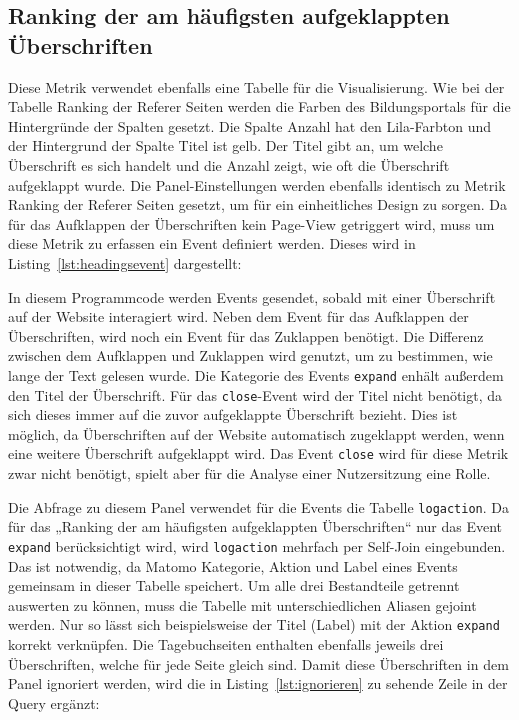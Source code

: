 \subsection{Ranking der am häufigsten aufgeklappten Überschriften}
Diese Metrik verwendet ebenfalls eine Tabelle für die Visualisierung. Wie bei der Tabelle \glqq Ranking der Referer Seiten\grqq{} werden die Farben des Bildungsportals für die Hintergründe der Spalten gesetzt. Die Spalte \glqq Anzahl\grqq{} hat den Lila-Farbton und der Hintergrund der Spalte \glqq Titel\grqq{} ist gelb. Der \glqq Titel\grqq{} gibt an, um welche Überschrift es sich handelt und die \glqq Anzahl\grqq{} zeigt, wie oft die Überschrift aufgeklappt wurde. Die Panel-Einstellungen werden ebenfalls identisch zu Metrik \glqq Ranking der Referer Seiten\grqq{} gesetzt, um für ein einheitliches Design zu sorgen. Da für das Aufklappen der Überschriften kein Page-View getriggert wird, muss um diese Metrik zu erfassen ein Event definiert werden. Dieses wird in Listing~\ref{lst:headingsevent} dargestellt:

\begin{figure}[H]
    \centering
    \begin{minipage}{\textwidth}
        
    \end{minipage}
\end{figure}

In diesem Programmcode werden Events gesendet, sobald mit einer Überschrift auf der Website interagiert wird. Neben dem Event für das Aufklappen der Überschriften, wird noch ein Event für das Zuklappen benötigt. Die Differenz zwischen dem Aufklappen und Zuklappen wird genutzt, um zu bestimmen, wie lange der Text gelesen wurde. Die Kategorie des Events \texttt{expand} enhält außerdem den Titel der Überschrift. Für das \texttt{close}-Event wird der Titel nicht benötigt, da sich dieses immer auf die zuvor aufgeklappte Überschrift bezieht. Dies ist möglich, da Überschriften auf der Website automatisch zugeklappt werden, wenn eine weitere Überschrift aufgeklappt wird. Das Event \texttt{close} wird für diese Metrik zwar nicht benötigt, spielt aber für die Analyse einer Nutzersitzung eine Rolle.

Die Abfrage zu diesem Panel verwendet für die Events die Tabelle \texttt{log\textunderscore action}. Da für das „Ranking der am häufigsten aufgeklappten Überschriften“ nur das Event \texttt{expand} berücksichtigt wird, wird \texttt{log\textunderscore action} mehrfach per Self-Join eingebunden. Das ist notwendig, da Matomo Kategorie, Aktion und Label eines Events gemeinsam in dieser Tabelle speichert. Um alle drei Bestandteile getrennt auswerten zu können, muss die Tabelle mit unterschiedlichen Aliasen gejoint werden. Nur so lässt sich beispielsweise der Titel (Label) mit der Aktion \texttt{expand} korrekt verknüpfen. Die Tagebuchseiten enthalten ebenfalls jeweils drei Überschriften, welche für jede Seite gleich sind. Damit diese Überschriften in dem Panel ignoriert werden, wird die in Listing~\ref{lst:ignorieren} zu sehende Zeile in der Query ergänzt: 

